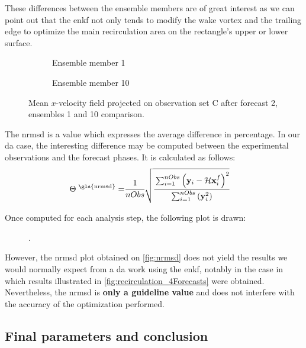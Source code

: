 \documentclass[12pt,twoside]{report}
\begin{document}
These differences between the ensemble members are of great interest as we can point out that the \gls{enkf} not only tends to modify the wake vortex and the trailing edge to optimize the main recirculation area on the rectangle's upper or lower surface.
\begin{figure}[h!]
  \begin{subfigure}[t]{.48\textwidth}
    \centering
    
    \caption{Ensemble member 1}
    \label{fig:F2_Ens1}
  \end{subfigure}
  \hfill
  \begin{subfigure}[t]{.48\textwidth}
    \centering
    
    \caption{Ensemble member 10}
    \label{fig:F2_Ens10}
  \end{subfigure}
  \caption{Mean $x$-velocity field projected on observation set C after forecast 2, ensembles 1 and 10 comparison.}
  \label{fig:Forecast2_Ensemble_1_and_10}
\end{figure}

The \gls{nrmsd} is a value which expresses the average difference in percentage. In our \gls{da} case, the interesting difference may be computed between the experimental observations and the forecast phases. It is calculated as follows:
\begin{align}
    \Theta^{\text{ \gls{nrmsd}}} =& \cfrac{1}{nObs} \sqrt{\cfrac{\sum_{i=1}^{nObs}\left(\mathbf{y}_i-\mathcal{H} \mathbf{x}_i^f\right)^2}{\sum_{i=1}^{nObs}\left(\mathbf{y}_i^2\right)}} \label{eq:nrmsd}
\end{align}

Once computed for each analysis step, the following plot is drawn:
\begin{figure}[h!]
    \centering
    
    \caption{.}
    \label{fig:nrmsd}
\end{figure}

However, the \gls{nrmsd} plot obtained on \autoref{fig:nrmsd} does not yield the results we would normally expect from a \gls{da} work using the \gls{enkf}, notably in the case in which results illustrated in \autoref{fig:recirculation_4Forecasts} were obtained. Nevertheless, the \gls{nrmsd} is \textbf{only a guideline value} and does not interfere with the accuracy of the optimization performed.

\clearpage

\subsection{Final parameters and conclusion}
\end{document}
